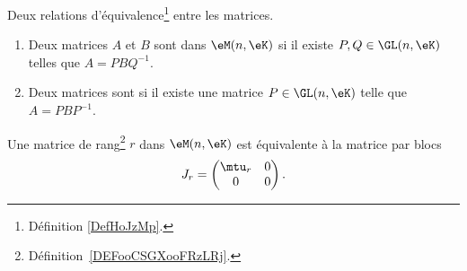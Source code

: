 \begin{propositionDef}  \label{DefBLELooTvlHoB}
	Deux relations d'équivalence\footnote{Définition \ref{DefHoJzMp}.} entre les matrices.
	\begin{enumerate}
		\item   \label{ItemPFXCooOUbSCt}
		      Deux matrices \( A\) et \( B\) sont  dans \( \eM(n,\eK)\) si il existe \( P,Q\in\GL(n,\eK)\) telles que \( A=PBQ^{-1}\).
		\item
		      Deux matrices sont  si il existe une matrice \( P\in \GL(n,\eK)\) telle que \( A=PBP^{-1}\).
	\end{enumerate}
\end{propositionDef}

\begin{lemma}   \label{LemZMxxnfM}
	Une matrice de rang\footnote{Définition~\ref{DEFooCSGXooFRzLRj}.} \( r\) dans \( \eM(n,\eK)\) est équivalente à la matrice par blocs
	\begin{equation}
		J_r=\begin{pmatrix}
			\mtu_r & 0 \\
			0      & 0
		\end{pmatrix}.
	\end{equation}
\end{lemma}


